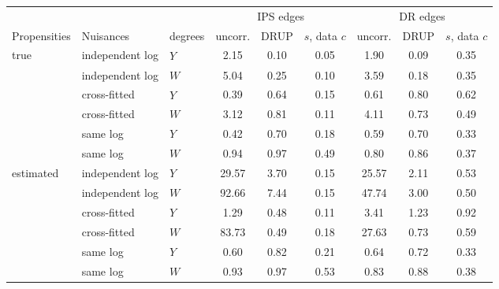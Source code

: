 \begin{tabular}{lllcccccc}
\toprule
 & & & \multicolumn{3}{c}{IPS edges} & \multicolumn{3}{c}{DR edges}\\
Propensities & Nuisances & degrees & uncorr. & DRUP & $s$, data $c$ & uncorr. & DRUP & $s$, data $c$\\
\midrule
true & independent log & $\hat Y$ & 2.15 & 0.10 & 0.05 & 1.90 & 0.09 & 0.35\\
 & independent log & $W$ & 5.04 & 0.25 & 0.10 & 3.59 & 0.18 & 0.35\\
 & cross-fitted & $\hat Y$ & 0.39 & 0.64 & 0.15 & 0.61 & 0.80 & 0.62\\
 & cross-fitted & $W$ & 3.12 & 0.81 & 0.11 & 4.11 & 0.73 & 0.49\\
 & same log & $\hat Y$ & 0.42 & 0.70 & 0.18 & 0.59 & 0.70 & 0.33\\
 & same log & $W$ & 0.94 & 0.97 & 0.49 & 0.80 & 0.86 & 0.37\\
\midrule
estimated & independent log & $\hat Y$ & 29.57 & 3.70 & 0.15 & 25.57 & 2.11 & 0.53\\
 & independent log & $W$ & 92.66 & 7.44 & 0.15 & 47.74 & 3.00 & 0.50\\
 & cross-fitted & $\hat Y$ & 1.29 & 0.48 & 0.11 & 3.41 & 1.23 & 0.92\\
 & cross-fitted & $W$ & 83.73 & 0.49 & 0.18 & 27.63 & 0.73 & 0.59\\
 & same log & $\hat Y$ & 0.60 & 0.82 & 0.21 & 0.64 & 0.72 & 0.33\\
 & same log & $W$ & 0.93 & 0.97 & 0.53 & 0.83 & 0.88 & 0.38\\
\bottomrule
\end{tabular}
